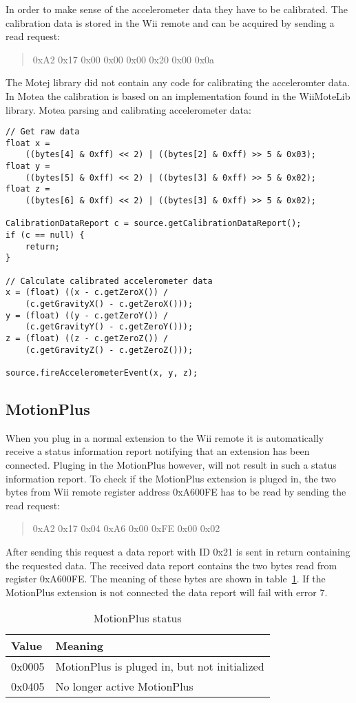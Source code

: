 In order to make sense of the accelerometer data they have to be calibrated. The calibration data is stored in the Wii remote and can be acquired by sending a read request:
\begin{quote}
0xA2 0x17 0x00 0x00 0x00 0x20 0x00 0x0a
\end{quote}

The Motej \cite{Motej} library did not contain any code for calibrating the acceleromter data. In Motea the calibration is based on an implementation found in the WiiMoteLib \cite{wiiMoteLib} library. Motea parsing and calibrating accelerometer data:
\begin{lstlisting}
// Get raw data
float x = 
	((bytes[4] & 0xff) << 2) | ((bytes[2] & 0xff) >> 5 & 0x03);
float y = 
	((bytes[5] & 0xff) << 2) | ((bytes[3] & 0xff) >> 5 & 0x02);
float z = 
	((bytes[6] & 0xff) << 2) | ((bytes[3] & 0xff) >> 5 & 0x02);

CalibrationDataReport c = source.getCalibrationDataReport();
if (c == null) {
	return;
}

// Calculate calibrated accelerometer data
x = (float) ((x - c.getZeroX()) / 
	(c.getGravityX() - c.getZeroX()));
y = (float) ((y - c.getZeroY()) / 
	(c.getGravityY() - c.getZeroY()));
z = (float) ((z - c.getZeroZ())	/ 
	(c.getGravityZ() - c.getZeroZ()));

source.fireAccelerometerEvent(x, y, z);
\end{lstlisting}

\subsection{MotionPlus}
\label{sec:gyroParse}
When you plug in a normal extension to the Wii remote it is automatically receive a status information report notifying that an extension has been connected. Pluging in the MotionPlus however, will not result in such a status information report. To check if the MotionPlus extension is pluged in, the two bytes from Wii remote register address 0xA600FE has to be read by sending the read request:
\begin{quote}
0xA2 0x17 0x04 0xA6 0x00 0xFE 0x00 0x02
\end{quote}
After sending this request a data report with ID 0x21 is sent in return containing the requested data. The received data report contains the two bytes read from register 0xA600FE. The meaning of these bytes are shown in table~\ref{tab:motionPlusStatus}. If the MotionPlus extension is not connected the data report will fail with error 7.
\begin{table}[h!]
\begin{tabularx}{\textwidth}{|l|X|}
\hline
Value  & Meaning \\ \hline
0x0005 & MotionPlus is pluged in, but not initialized \\ \hline
0x0405 & No longer active MotionPlus\\ 
\hline
\end{tabularx}
\caption{\footnotesize MotionPlus status}
\label{tab:motionPlusStatus}
\end{table}

